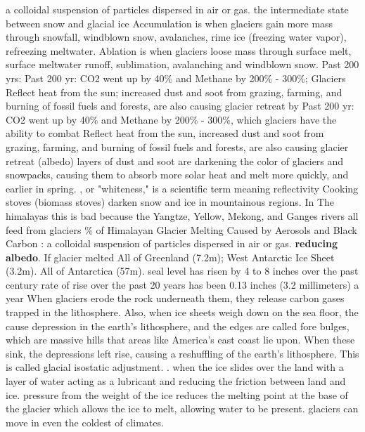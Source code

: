  a colloidal suspension of particles dispersed in air or gas.
 the intermediate state between snow and glacial ice
 Accumulation is when glaciers gain more mass through snowfall, windblown snow, avalanches, rime ice (freezing water vapor), refreezing meltwater.
 Ablation is when glaciers loose mass through surface melt, surface meltwater runoff, sublimation, avalanching and windblown snow.
Past 200 yrs: Past 200 yr: CO2 went up by 40\% and Methane by 200\% - 300\%; Glaciers Reflect heat from the sun; increased dust and soot from grazing, farming, and burning of fossil fuels and forests, are also causing glacier retreat by
\ddd Past 200 yr: CO2 went up by 40\% and Methane by 200\% - 300\%, which glaciers have the ability to combat
\ddd Reflect heat from the sun, 
\ddd increased dust and soot from grazing, farming, and burning of fossil fuels and forests, are also causing glacier retreat (albedo)
\ddd layers of dust and soot are darkening the color of glaciers and snowpacks, causing them to absorb more solar heat and melt more quickly, and earlier in spring.
\ddd {}, or "whiteness," is a scientific term meaning reflectivity
\ddd Cooking stoves (biomass stoves) darken snow and ice in mountainous regions. In The himalayas this is bad because the Yangtze, Yellow, Mekong, and Ganges rivers all feed from glaciers
\% of Himalayan Glacier Melting Caused by Aerosols and Black Carbon
\ddd {}: a colloidal suspension of particles dispersed in air or gas.
\textbf{reducing albedo}.
 If glacier melted 
 All of Greenland (7.2m); West Antarctic Ice Sheet (3.2m). All of Antarctica (57m). 
\ddd seal level has risen by 4 to 8 inches over the past century
\ddd rate of rise over the past 20 years has been 0.13 inches (3.2 millimeters) a year
 When glaciers erode the rock underneath them, they release carbon gases trapped in the lithosphere. Also, when ice sheets weigh down on the sea floor, the cause depression in the earth's lithosphere, and the edges are called fore bulges, which are massive hills that areas like America's east coast lie upon. When these sink, the depressions left rise, causing a reshuffling of the earth's lithosphere. This is called glacial isostatic adjustment.
. when the ice slides over the land with a layer of water acting as a lubricant and reducing the friction between land and ice. pressure from the weight of the ice reduces the melting point at the base of the glacier which allows the ice to melt, allowing water to be present.  glaciers can move in even the coldest of climates.